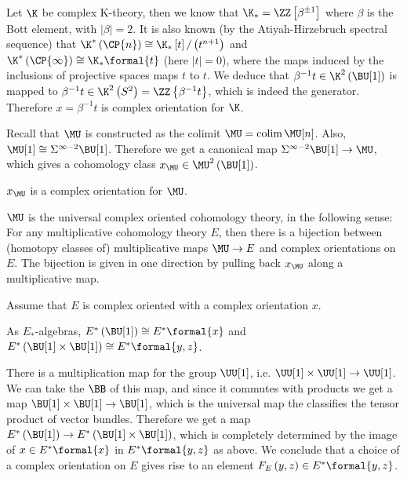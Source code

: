 \begin{example}\label{k-thy-oriented}
	Let $\K$ be complex K-theory, then we know that $\K_* = \ZZ\left[\beta^{\pm 1}\right]$ where $\beta$ is the Bott element, with $\left|\beta\right| = 2$.
	It is also known (by the Atiyah-Hirzebruch spectral sequence) that
	$\K^*\left(\CP{n}\right) \cong \K_* \left[t\right] / \left(t^{n+1}\right)$
	and
	$\K^*\left(\CP{\infty}\right) \cong \K_* \formal{t}$
	(here $\left|t\right| = 0$),
	where the maps induced by the inclusions of projective spaces maps $t$ to $t$.
	We deduce that $\beta^{-1} t \in \K^2\left(\BU[1]\right)$ is mapped to $\beta^{-1} t \in \K^2\left(S^2\right) = \ZZ\left\{\beta^{-1} t\right\}$, which is indeed the generator.
	Therefore $x = \beta^{-1} t$ is complex orientation for $\K$.
\end{example}

\begin{example}
	Recall that $\MU$ is constructed as the colimit $\MU = \colim \MU[n]$.
	Also, $\MU[1] \cong \Sigma^{\infty-2} \BU[1]$.
	Therefore we get a canonical map $\Sigma^{\infty-2} \BU[1] \to \MU$, which gives a cohomology class $x_{\MU} \in \MU^2\left(\BU[1]\right)$.
\end{example}

\begin{proposition}
	$x_{\MU}$ is a complex orientation for $\MU$.
\end{proposition}

\begin{theorem}
	$\MU$ is the universal complex oriented cohomology theory, in the following sense:
	For any multiplicative cohomology theory $E$, then there is a bijection between (homotopy classes of) multiplicative maps $\MU \to E$ and complex orientations on $E$.
	The bijection is given in one direction by pulling back $x_{\MU}$ along a multiplicative map.
\end{theorem}

Assume that $E$ is complex oriented with a complex orientation $x$.

\begin{proposition}
	As $E_*$-algebras,
	$E^*\left(\BU[1]\right) \cong E^*\formal{x}$
	and
	$E^*\left(\BU[1] \times \BU[1]\right) \cong E^*\formal{y,z}$.
\end{proposition}

There is a multiplication map for the group $\UU[1]$, i.e. $\UU[1] \times \UU[1] \to \UU[1]$.
We can take the $\BB$ of this map, and since it commutes with products we get a map $\BU[1] \times \BU[1] \to \BU[1]$, which is the universal map the classifies the tensor product of vector bundles.
Therefore we get a map $E^*\left(\BU[1]\right) \to E^*\left(\BU[1] \times \BU[1]\right)$, which is completely determined by the image of $x \in E^*\formal{x}$ in $E^*\formal{y,z}$ as above.
We conclude that a choice of a complex orientation on $E$ gives rise to an element $F_E\left(y,z\right) \in E^*\formal{y,z}$.


